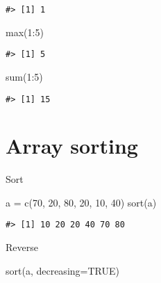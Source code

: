 \documentclass[
]{book}
\newenvironment{Shaded}{\begin{snugshade}}{\end{snugshade}}
\newcommand{\AttributeTok}[1]{\textcolor[rgb]{0.77,0.63,0.00}{#1}}
\newcommand{\ConstantTok}[1]{\textcolor[rgb]{0.00,0.00,0.00}{#1}}
\newcommand{\DecValTok}[1]{\textcolor[rgb]{0.00,0.00,0.81}{#1}}
\newcommand{\FunctionTok}[1]{\textcolor[rgb]{0.00,0.00,0.00}{#1}}
\newcommand{\NormalTok}[1]{#1}
\newcommand{\OtherTok}[1]{\textcolor[rgb]{0.56,0.35,0.01}{#1}}
\newcommand{\SpecialCharTok}[1]{\textcolor[rgb]{0.00,0.00,0.00}{#1}}
\begin{document}
\begin{verbatim}
#> [1] 1
\end{verbatim}

\begin{Shaded}
\begin{Highlighting}[]
\FunctionTok{max}\NormalTok{(}\DecValTok{1}\SpecialCharTok{:}\DecValTok{5}\NormalTok{)}
\end{Highlighting}
\end{Shaded}

\begin{verbatim}
#> [1] 5
\end{verbatim}

\begin{Shaded}
\begin{Highlighting}[]
\FunctionTok{sum}\NormalTok{(}\DecValTok{1}\SpecialCharTok{:}\DecValTok{5}\NormalTok{)}
\end{Highlighting}
\end{Shaded}

\begin{verbatim}
#> [1] 15
\end{verbatim}

\hypertarget{array-sorting}{%
\section{Array sorting}\label{array-sorting}}

Sort

\begin{Shaded}
\begin{Highlighting}[]
\NormalTok{a }\OtherTok{=} \FunctionTok{c}\NormalTok{(}\DecValTok{70}\NormalTok{, }\DecValTok{20}\NormalTok{, }\DecValTok{80}\NormalTok{, }\DecValTok{20}\NormalTok{, }\DecValTok{10}\NormalTok{, }\DecValTok{40}\NormalTok{)}
\FunctionTok{sort}\NormalTok{(a)}
\end{Highlighting}
\end{Shaded}

\begin{verbatim}
#> [1] 10 20 20 40 70 80
\end{verbatim}

Reverse

\begin{Shaded}
\begin{Highlighting}[]
\FunctionTok{sort}\NormalTok{(a, }\AttributeTok{decreasing=}\ConstantTok{TRUE}\NormalTok{)}
\end{Highlighting}
\end{Shaded}
\end{document}
